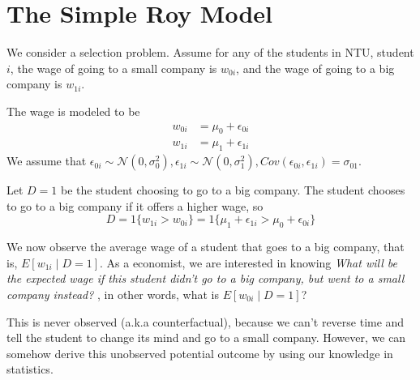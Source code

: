 \documentclass{article}
\begin{document}
\section{The Simple Roy Model}
We consider a selection problem. 
        Assume for any of the students in NTU, student $i$, the wage of going to a small company is $w_{0i}$, 
        and the wage of going to a big company is $w_{1i}$. 

        The wage is modeled to be 
        \begin{align}
            w_{0i} &= \mu_0 + \epsilon_{0i}\\
            w_{1i} &= \mu_1 + \epsilon_{1i}
        \end{align}
        We assume that 
        $\epsilon_{0i} \sim \mathcal{N}(0,\sigma_0^2), \epsilon_{1i} \sim \mathcal{N}(0,\sigma_1^2), Cov(\epsilon_{0i}, \epsilon_{1i}) = \sigma_{01}$.
        
        Let $D=1$ be the student choosing to go to a big company. 
        The student chooses to go to a big company if it offers a higher wage, so 
        \begin{equation*}
            D = 1\{w_{1i} > w_{0i}\} = 1\{\mu_1 + \epsilon_{1i} > \mu_0 + \epsilon_{0i}\}
        \end{equation*}

        We now observe the average wage of a student that goes to a big company, that is, $E[w_{1i} \mid D=1]$. 
        As a economist, we are interested in knowing \emph{What will be the expected wage if this student didn't go to a big company, but went to a small company instead?}
        , in other words, what is $E[w_{0i} \mid D=1]$? 

        This is never observed (a.k.a counterfactual), because we can't reverse time and tell the student to change its mind and go to a small company. 
        However, we can somehow derive this unobserved potential outcome by using our knowledge in statistics.
\end{document}

